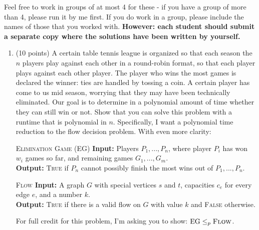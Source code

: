 \documentclass[12pt,letterpaper]{article}
\begin{document}
Feel free to work in groups of at most 4 for these - if you have a group of more than 4, please run it by me first. If you do work in a group, please include the names of those that you worked with. \textbf{However: each student should submit a separate copy where the solutions have been written by yourself.}

\begin{enumerate}
    \item (10 points) A certain table tennis league is organized so that each season the $n$ players play against each other in a round-robin format, so that each player plays against each other player. The player who wins the most games is declared the winner: ties are handled by tossing a coin. A certain player has come to us mid season, worrying that they may have been technically eliminated. Our goal is to determine in a polynomial amount of time whether they can still win or not. Show that you can solve this problem with a runtime that is polynomial in $n$. Specifically, I want a polynomial time reduction to the flow decision problem. With even more clarity: 
    \begin{beamerlikethm}{\textsc{Elimination Game (EG)}}
        \textbf{Input: }Players $P_1, ..., P_n$, where player $P_i$ has won $w_i$ games so far, and remaining games $G_1, ..., G_m$. \\
        \textbf{Output: }\textsc{True} if $P_n$ cannot possibly finish the most wins out of $P_1, ..., P_n$.
    \end{beamerlikethm} 
    \begin{beamerlikethm}{\textsc{Flow}}
        \textbf{Input: }A graph $G$ with special vertices $s$ and $t$, capacities $c_e$ for every edge $e$, and a number $k$.\\
        \textbf{Output: }\textsc{True} if there is a valid flow on $G$ with value $k$ and \textsc{False} otherwise.
    \end{beamerlikethm}
    For full credit for this problem, I'm asking you to show:  $\text{EG}\leq_p\textsc{Flow}$.
    

\end{enumerate}
\end{document}

